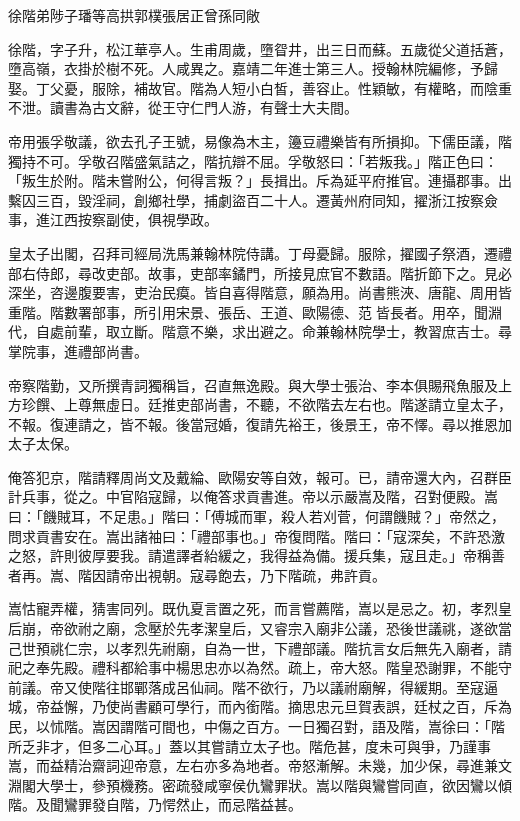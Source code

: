 
\begin{pinyinscope}
徐階弟陟子璠等高拱郭樸張居正曾孫同敞

徐階，字子升，松江華亭人。生甫周歲，墮眢井，出三日而蘇。五歲從父道括蒼，墮高嶺，衣掛於樹不死。人咸異之。嘉靖二年進士第三人。授翰林院編修，予歸娶。丁父憂，服除，補故官。階為人短小白皙，善容止。性穎敏，有權略，而陰重不泄。讀書為古文辭，從王守仁門人游，有聲士大夫間。

帝用張孚敬議，欲去孔子王號，易像為木主，籩豆禮樂皆有所損抑。下儒臣議，階獨持不可。孚敬召階盛氣詰之，階抗辯不屈。孚敬怒曰：「若叛我。」階正色曰：「叛生於附。階未嘗附公，何得言叛？」長揖出。斥為延平府推官。連攝郡事。出繫囚三百，毀淫祠，創鄉社學，捕劇盜百二十人。遷黃州府同知，擢浙江按察僉事，進江西按察副使，俱視學政。

皇太子出閣，召拜司經局洗馬兼翰林院侍講。丁母憂歸。服除，擢國子祭酒，遷禮部右侍郎，尋改吏部。故事，吏部率鐍門，所接見庶官不數語。階折節下之。見必深坐，咨邊腹要害，吏治民瘼。皆自喜得階意，願為用。尚書熊浹、唐龍、周用皆重階。階數署部事，所引用宋景、張岳、王道、歐陽德、范皆長者。用卒，聞淵代，自處前輩，取立斷。階意不樂，求出避之。命兼翰林院學士，教習庶吉士。尋掌院事，進禮部尚書。

帝察階勤，又所撰青詞獨稱旨，召直無逸殿。與大學士張治、李本俱賜飛魚服及上方珍饌、上尊無虛日。廷推吏部尚書，不聽，不欲階去左右也。階遂請立皇太子，不報。復連請之，皆不報。後當冠婚，復請先裕王，後景王，帝不懌。尋以推恩加太子太保。

俺答犯京，階請釋周尚文及戴綸、歐陽安等自效，報可。已，請帝還大內，召群臣計兵事，從之。中官陷寇歸，以俺答求貢書進。帝以示嚴嵩及階，召對便殿。嵩曰：「饑賊耳，不足患。」階曰：「傅城而軍，殺人若刈菅，何謂饑賊？」帝然之，問求貢書安在。嵩出諸袖曰：「禮部事也。」帝復問階。階曰：「寇深矣，不許恐激之怒，許則彼厚要我。請遣譯者紿緩之，我得益為備。援兵集，寇且走。」帝稱善者再。嵩、階因請帝出視朝。寇尋飽去，乃下階疏，弗許貢。

嵩怙寵弄權，猜害同列。既仇夏言置之死，而言嘗薦階，嵩以是忌之。初，孝烈皇后崩，帝欲祔之廟，念壓於先孝潔皇后，又睿宗入廟非公議，恐後世議祧，遂欲當己世預祧仁宗，以孝烈先祔廟，自為一世，下禮部議。階抗言女后無先入廟者，請祀之奉先殿。禮科都給事中楊思忠亦以為然。疏上，帝大怒。階皇恐謝罪，不能守前議。帝又使階往邯鄲落成呂仙祠。階不欲行，乃以議祔廟解，得緩期。至寇逼城，帝益懈，乃使尚書顧可學行，而內銜階。摘思忠元旦賀表誤，廷杖之百，斥為民，以怵階。嵩因謂階可間也，中傷之百方。一日獨召對，語及階，嵩徐曰：「階所乏非才，但多二心耳。」蓋以其嘗請立太子也。階危甚，度未可與爭，乃謹事嵩，而益精治齋詞迎帝意，左右亦多為地者。帝怒漸解。未幾，加少保，尋進兼文淵閣大學士，參預機務。密疏發咸寧侯仇鸞罪狀。嵩以階與鸞嘗同直，欲因鸞以傾階。及聞鸞罪發自階，乃愕然止，而忌階益甚。


\end{pinyinscope}
